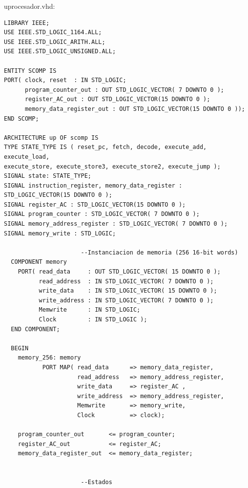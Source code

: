 uprocesador.vhd:
\begin{lstlisting}[style=vhdl, basicstyle=\footnotesize\ttfamily]
LIBRARY IEEE;
USE IEEE.STD_LOGIC_1164.ALL;
USE IEEE.STD_LOGIC_ARITH.ALL;
USE IEEE.STD_LOGIC_UNSIGNED.ALL;

ENTITY SCOMP IS 
PORT( clock, reset  : IN STD_LOGIC;
      program_counter_out : OUT STD_LOGIC_VECTOR( 7 DOWNTO 0 );
      register_AC_out : OUT STD_LOGIC_VECTOR(15 DOWNTO 0 );
      memory_data_register_out : OUT STD_LOGIC_VECTOR(15 DOWNTO 0 ));
END SCOMP;

ARCHITECTURE up OF scomp IS
TYPE STATE_TYPE IS ( reset_pc, fetch, decode, execute_add, execute_load, 
execute_store, execute_store3, execute_store2, execute_jump );
SIGNAL state: STATE_TYPE;
SIGNAL instruction_register, memory_data_register : STD_LOGIC_VECTOR(15 DOWNTO 0 );
SIGNAL register_AC : STD_LOGIC_VECTOR(15 DOWNTO 0 );
SIGNAL program_counter : STD_LOGIC_VECTOR( 7 DOWNTO 0 );
SIGNAL memory_address_register : STD_LOGIC_VECTOR( 7 DOWNTO 0 );
SIGNAL memory_write : STD_LOGIC;

                      --Instanciacion de memoria (256 16-bit words)
  COMPONENT memory
    PORT( read_data     : OUT STD_LOGIC_VECTOR( 15 DOWNTO 0 );
          read_address  : IN STD_LOGIC_VECTOR( 7 DOWNTO 0 );
          write_data    : IN STD_LOGIC_VECTOR( 15 DOWNTO 0 ); 
          write_address : IN STD_LOGIC_VECTOR( 7 DOWNTO 0 );
          Memwrite      : IN STD_LOGIC;
          Clock         : IN STD_LOGIC );
  END COMPONENT;

  BEGIN
    memory_256: memory
           PORT MAP( read_data      => memory_data_register,
                     read_address   => memory_address_register,
                     write_data     => register_AC , 
                     write_address  => memory_address_register,
                     Memwrite       => memory_write,   
                     Clock          => clock);

    program_counter_out       <= program_counter;
    register_AC_out           <= register_AC;
    memory_data_register_out  <= memory_data_register;


                      --Estados


\end{lstlisting}
